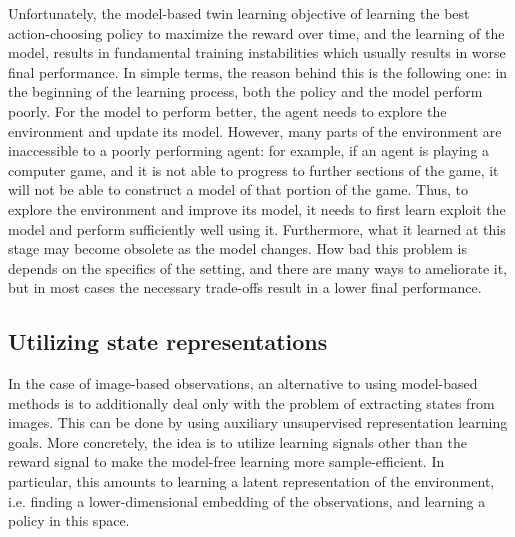 Unfortunately, the model-based twin learning objective of 
learning the best action-choosing policy 
to maximize the reward over time, and the learning of the model, results
in fundamental training instabilities which usually results in worse final performance.
In simple terms, the reason behind this is the following one:
in the beginning of the learning process, both the policy and the model perform poorly.
For the model to perform better, the agent needs to explore the environment and
update its model.
However, many parts of the environment are inaccessible to a poorly performing agent:
for example, if an agent is playing a computer game, and it is not able to progress to further
sections of the game, it will not be able to construct a model of that portion of the game.
Thus, to explore the environment and improve its model, it needs to first learn exploit 
the model and perform sufficiently well using it.
Furthermore, what it learned at this stage may become obsolete as the model changes.
How bad this problem is depends on the specifics of the setting,
and there are many ways to ameliorate it,
but in most cases the necessary trade-offs result in a lower final performance.


\subsection{Utilizing state representations}
In the case of image-based observations, 
an alternative to using model-based methods is to additionally deal only with the problem
of extracting states from images.
This can be done by using auxiliary unsupervised representation learning goals.
More concretely, the idea is
to utilize learning signals other than the reward signal
to make the model-free learning more sample-efficient.
In particular, this amounts to learning a latent representation of the environment,
i.e. finding a lower-dimensional embedding of the observations,
and learning a policy in this space.


